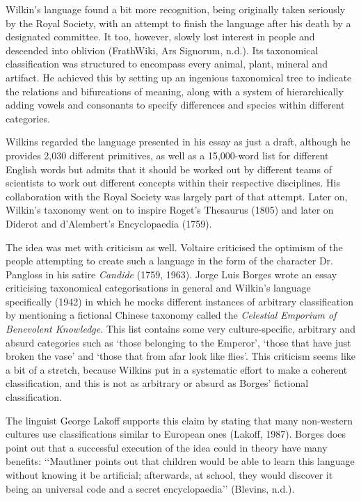 Wilkin’s language found a bit more recognition, being originally taken seriously by the Royal Society, with an attempt to finish the language after his death by a designated committee. It too, however, slowly lost interest in people and descended into oblivion  (FrathWiki, Ars Signorum, n.d.). Its taxonomical classification was structured to encompass every animal, plant, mineral and artifact. He achieved this by setting up an ingenious taxonomical tree to indicate the relations and bifurcations of meaning, along with a system of hierarchically adding vowels and consonants to specify differences and species within different categories. 

Wilkins regarded the language presented in his essay as just a draft, although he provides 2,030 different primitives, as well as a 15,000-word list for different English words but admits that it should be worked out by different teams of scientists to work out different concepts within their respective disciplines. His collaboration with the Royal Society was largely part of that attempt. Later on, Wilkin’s taxonomy went on to inspire Roget’s Thesaurus (1805) and later on Diderot and d’Alembert’s Encyclopaedia (1759).  

The idea was met with criticism as well. Voltaire criticised the optimism of the people attempting to create such a language in the form of the character Dr. Pangloss in his satire \textit{Candide} (1759, 1963). Jorge Luis Borges wrote an essay criticising taxonomical categorisations in general and Wilkin’s language specifically (1942) in which he mocks different instances of arbitrary classification by mentioning a fictional Chinese taxonomy called the \textit{Celestial Emporium of Benevolent Knowledge}. This list contains some very culture-specific, arbitrary and absurd categories such as ‘those belonging to the Emperor’, ‘those that have just broken the vase’ and ‘those that from afar look like flies’. This criticism seems like a bit of a stretch, because Wilkins put in a systematic effort to make a coherent classification, and this is not as arbitrary or absurd as Borges’ fictional classification. 

The linguist George Lakoff supports this claim by stating that many non-western cultures use classifications similar to European ones (Lakoff, 1987). Borges does point out that a successful execution of the idea could in theory have many benefits: ‘‘Mauthner points out that children would be able to learn this language without knowing it be artificial; afterwards, at school, they would discover it being an universal code and a secret encyclopaedia’’ (Blevins, n.d.). 

